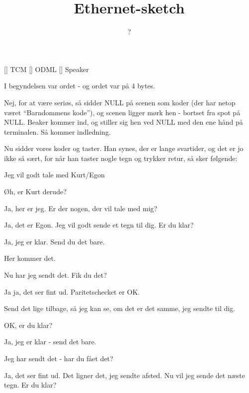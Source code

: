 \documentclass[a4paper,11pt]{article}
\title{Ethernet-sketch}
\author{?}
\begin{document}
\maketitle

\begin{roles}
  [] TCM
  [] ODML
  [] Speaker
\end{roles}

\begin{sketch}

  I begyndelsen var ordet - og ordet var på 4 bytes.

  Nej, for at være seriøs, så sidder NULL på scenen som koder (der har
  netop været "`Barndommens kode"'), og scenen ligger mørk hen - bortset
  fra spot på NULL.  Beaker kommer ind, og stiller sig hen ved NULL med
  den ene hånd på terminalen.  Så kommer indledning.

   Nu sidder vores koder og taster.  Han synes, der er lange
  svartider, og det er jo ikke så sært, for når han taster nogle tegn og
  trykker retur, så sker følgende:


   Jeg vil godt tale med Kurt/Egon



   Øh, er Kurt derude?

   Ja, her er jeg.  Er der nogen, der vil tale med mig?

   Ja, det er Egon.  Jeg vil godt sende et tegn til dig.  Er du
  klar?

   Ja, jeg er klar.  Send du det bare.

   Her kommer det.

   Nu har jeg sendt det.  Fik du det?

   Ja ja, det ser fint ud.  Paritetschecket er OK.

   Send det lige tilbage, så jeg kan se, om det er det samme,
  jeg sendte til dig.

   OK, er du klar?

   Ja, jeg er klar - send det bare.

   Jeg har sendt det - har du fået det?

   Ja, det ser fint ud.  Det ligner det, jeg sendte afsted.  Nu
  vil jeg sende det næste tegn.  Er du klar?


\end{sketch}
\end{document}
